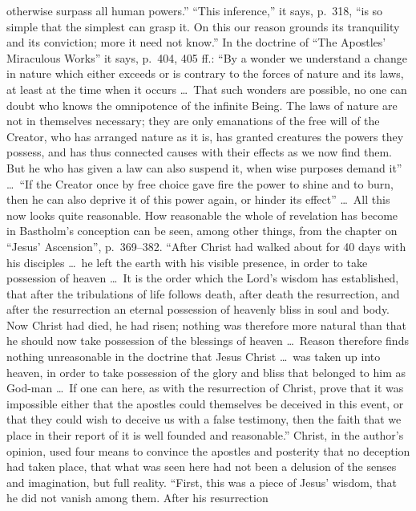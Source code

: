 \documentclass[12pt,a4paper]{article}
\newcommand{\opage}[1]{\marginnote{\footnotesize\textit{[#1]}}}
\begin{document}
otherwise surpass all human powers.'' ``This inference,'' it says, p.\ 318,
``is so simple that the simplest can grasp it. On this our reason grounds
its tranquility and its conviction; more it need not know.'' In the
doctrine of ``The Apostles' Miraculous Works'' it says, p.\ 404, 405 ff.:
``By a wonder we understand a change in nature which either exceeds or is
contrary to the forces of nature and its laws, at least at the time when it
occurs \ldots\ That such wonders are possible, no one can doubt who knows
the omnipotence of the infinite Being. The laws of nature are not in
themselves necessary; they are only emanations of the free will of the
Creator, who has arranged nature as it is, has granted creatures the powers
they possess, and has thus
\opage{28}connected causes with their effects as we now find them. But he who has
given a law can also suspend it, when wise purposes demand it'' \ldots\ ``If
the Creator once by free choice gave fire the power to shine and to burn,
then he can also deprive it of this power again, or hinder its effect''
\ldots\ All this now looks quite reasonable. How reasonable the whole of
revelation has become in Bastholm's conception can be seen, among other
things, from the chapter on ``Jesus' Ascension'', p.\ 369--382. ``After Christ
had walked about for 40 days with his disciples \ldots\ he left the earth
with his visible presence, in order to take possession of heaven \ldots\ It
is the order which the Lord's wisdom has established, that after the
tribulations of life follows death, after death the resurrection, and after
the resurrection an eternal possession of heavenly bliss in soul and body.
Now Christ had died, he had risen; nothing was therefore more natural than
that he should now take possession of the blessings of heaven \ldots\ Reason
therefore finds nothing unreasonable in the doctrine that Jesus Christ
\ldots\ was taken up into heaven, in order to take possession of the glory
and bliss that belonged to him as God-man \ldots\ If one can here, as with
the resurrection of Christ, prove that it was impossible either that the
apostles could themselves be deceived in this event, or that they could
wish to deceive us with a false testimony, then the faith that we place in
their report of it is well founded and reasonable.'' Christ, in the author's
opinion, used four means to convince the apostles and posterity that no
deception had taken place, that what was seen here had not been a delusion
of the senses and imagination, but full reality. ``First, this was a piece
of Jesus' wisdom, that he did not vanish among them. After his resurrection
\end{document}
